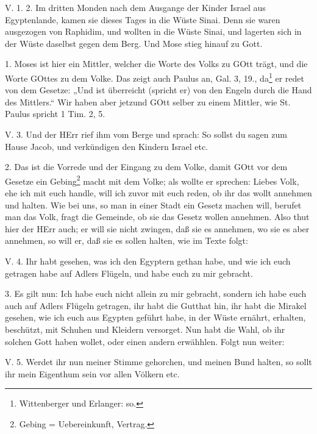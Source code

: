 \begin{schriftzitat}
V. 1. 2. Im dritten Monden nach dem Ausgange der Kinder Israel aus Egyptenlande, kamen sie dieses Tages in die Wüste Sinai. Denn sie waren ausgezogen von Raphidim, und wollten in die Wüste Sinai, und lagerten sich in der Wüste daselbst gegen dem Berg. Und Mose stieg hinauf zu Gott.
\end{schriftzitat}

1. Moses ist hier ein Mittler, welcher die Worte des Volks zu GOtt trägt, und die Worte GOttes zu dem Volke. Das zeigt auch Paulus an, Gal. 3, 19., da\footnote{Wittenberger und Erlanger: so.} er redet von dem Gesetze: „Und ist überreicht (spricht er) von den Engeln durch die Hand des Mittlers.“ Wir haben aber jetzund GOtt selber zu einem Mittler, wie St. Paulus spricht 1 Tim. 2, 5.

\begin{schriftzitat}
V. 3. Und der HErr rief ihm vom Berge und sprach: So sollst du sagen zum Hause Jacob, und verkündigen den Kindern Israel etc.
\end{schriftzitat}

2. Das ist die Vorrede und der Eingang zu dem Volke, damit GOtt vor dem Gesetze ein Gebing\footnote{Gebing = Uebereinkunft, Vertrag.} macht mit dem Volke; als wollte er sprechen: Liebes Volk, ehe ich mit euch handle, will ich zuvor mit euch reden, ob ihr das wollt annehmen und halten. Wie bei uns, so man in einer Stadt ein Gesetz machen will, berufet man das Volk, fragt die Gemeinde, ob sie das Gesetz wollen annehmen. Also thut hier der HErr auch; er will sie nicht zwingen, daß sie es annehmen, wo sie es aber annehmen, so will er, daß sie es sollen halten, wie im Texte folgt:

\begin{schriftzitat}
V. 4. Ihr habt gesehen, was ich den Egyptern gethan habe, und wie ich euch getragen habe auf Adlers Flügeln, und habe euch zu mir gebracht.
\end{schriftzitat}

3. Es gilt nun: Ich habe euch nicht allein zu mir gebracht, sondern ich habe euch auch auf Adlers Flügeln getragen, ihr habt die Gutthat hin, ihr habt die Mirakel gesehen, wie ich euch aus Egypten geführt habe, in der Wüste ernährt, erhalten, beschützt, mit Schuhen und Kleidern versorget. Nun habt die Wahl, ob ihr
solchen Gott haben wollet, oder einen andern erwähhlen. Folgt nun weiter:

\begin{schriftzitat}
V. 5. Werdet ihr nun meiner Stimme gehorchen, und meinen Bund halten, so sollt ihr mein Eigenthum sein vor allen Völkern etc.
\end{schriftzitat}

